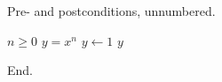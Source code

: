 \documentclass{article}
\begin{document}
Pre- and postconditions, unnumbered.

\begin{algorithm}[h]
\caption{Conditions}
\begin{algorithmic}
\REQUIRE $n \geq 0$
\ENSURE $y = x^n$
\STATE $y \gets 1$
\PRINT $y$
\end{algorithmic}
\end{algorithm}

End.
\end{document}
